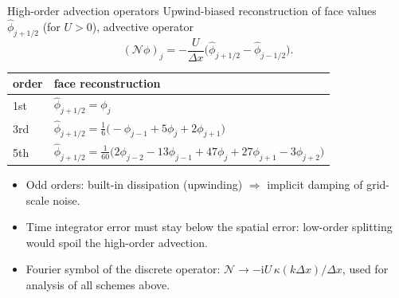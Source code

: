 \documentclass[aspectratio=169,10pt]{beamer}
\newcommand{\ii}{\mathrm{i}}
\newcommand{\NN}{\mathcal{N}}   %
\begin{document}
\begin{frame}{High-order advection operators}
  Upwind-biased reconstruction of face values $\hat\phi_{j+1/2}$ (for $U>0$), advective operator
  \[
    (\NN\phi)_j=-\frac{U}{\Delta x}\big(\hat\phi_{j+1/2}-\hat\phi_{j-1/2}\big).
  \]
  \begin{center}
  \begin{tabular}{ll}
    \toprule
    order & face reconstruction \\
    \midrule
    1st & $\hat\phi_{j+1/2}=\phi_j$\\
    3rd & $\hat\phi_{j+1/2}=\tfrac16\big(-\phi_{j-1}+5\phi_j+2\phi_{j+1}\big)$\\
    5th & $\hat\phi_{j+1/2}=\tfrac1{60}\big(2\phi_{j-2}-13\phi_{j-1}+47\phi_j+27\phi_{j+1}-3\phi_{j+2}\big)$\\
    \bottomrule
  \end{tabular}
  \end{center}
  \begin{itemize}
    \item Odd orders: built-in dissipation (upwinding) $\Rightarrow$ implicit damping of grid-scale noise.
    \item Time integrator error must stay below the spatial error: low-order splitting would spoil the high-order advection.
    \item Fourier symbol of the discrete operator: $\NN\to-\ii U\,\kappa(k\Delta x)/\Delta x$, used for analysis of all schemes above.
  \end{itemize}
\end{frame}
\end{document}
